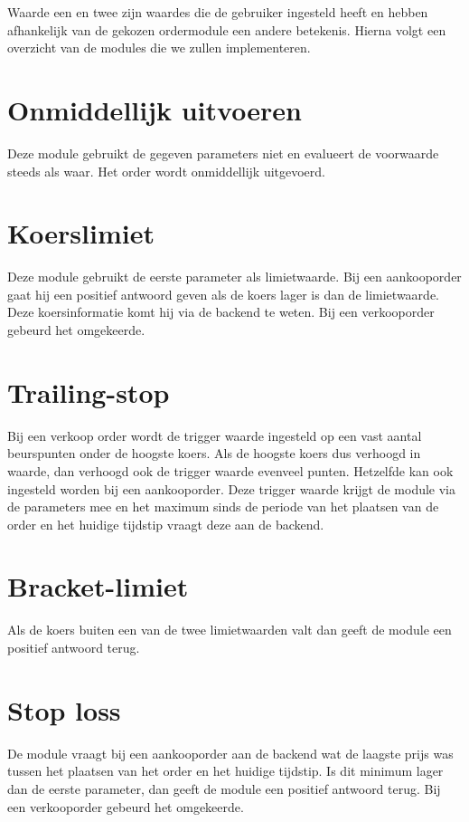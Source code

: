 Waarde een en twee zijn waardes die de gebruiker ingesteld heeft en hebben afhankelijk van de gekozen ordermodule een andere betekenis.
Hierna volgt een overzicht van de modules die we zullen implementeren.

\section{Onmiddellijk uitvoeren}
Deze module gebruikt de gegeven parameters niet en evalueert de voorwaarde steeds als waar. Het order wordt onmiddellijk uitgevoerd.

\section{Koerslimiet}
Deze module gebruikt de eerste parameter als limietwaarde. Bij een aankooporder gaat hij een positief antwoord geven als de koers lager is dan de limietwaarde. Deze koersinformatie komt hij via de backend te weten. Bij een verkooporder gebeurd het omgekeerde. 

\section{Trailing-stop}
Bij een verkoop order wordt de trigger waarde ingesteld op een vast aantal beurspunten onder de hoogste koers. Als de hoogste koers dus verhoogd in waarde, dan verhoogd ook de trigger waarde evenveel punten. Hetzelfde kan ook ingesteld worden bij een aankooporder. Deze trigger waarde krijgt de module via de parameters mee en het maximum sinds de periode van het plaatsen van de order en het huidige tijdstip vraagt deze aan de backend.

\section{Bracket-limiet}
Als de koers buiten een van de twee limietwaarden valt dan geeft de module een positief antwoord terug.

\section{Stop loss}
De module vraagt bij een aankooporder aan de backend wat de laagste prijs was tussen het plaatsen van het order en het huidige tijdstip. Is dit minimum lager dan de eerste parameter, dan geeft de module een positief antwoord terug. Bij een verkooporder gebeurd het omgekeerde.


%
%

